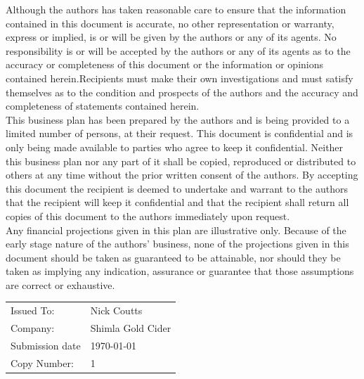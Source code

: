 \documentclass[11pt]{article}
\begin{document}
\noindent Although the authors has taken reasonable care to ensure that the information contained in this document is accurate, no other representation or warranty, express or implied, is or will be given by the authors or any of its agents. No responsibility is or will be accepted by the authors or any of its agents as to the accuracy or completeness of this document or the information or opinions contained herein.Recipients must make their own investigations and must satisfy themselves as to the condition and prospects of the authors and the accuracy and completeness of statements contained herein. \\

\noindent This business plan has been prepared by the authors and is being provided to a limited number of persons, at their request. This document is confidential and is only being made available to parties who agree to keep it confidential. Neither this business plan nor any part of it shall be copied, reproduced or distributed to others at any time without the prior written consent of the authors. By accepting this document the recipient is deemed to undertake and warrant to the authors that the recipient will keep it confidential and that the recipient shall return all copies of this document to the authors immediately upon request. \\

\noindent Any financial projections given in this plan are illustrative only. Because of the early stage nature of the authors' business, none of the projections given in this document should be taken as guaranteed to be attainable, nor should they be taken as implying any indication, assurance or guarantee that those assumptions are correct or exhaustive.
\vfill
\begin{table}[H]
\begin{center}
\begin{tabular}{| l l |}
\hline
Issued To:      &  Nick Coutts        \\
Company:        &  Shimla Gold Cider  \\
Submission date &  \today             \\
Copy Number:    &  1                  \\
\hline
\end{tabular}
\end{center}
\end{table}

\newpage
\tableofcontents

\newpage
\end{document}
